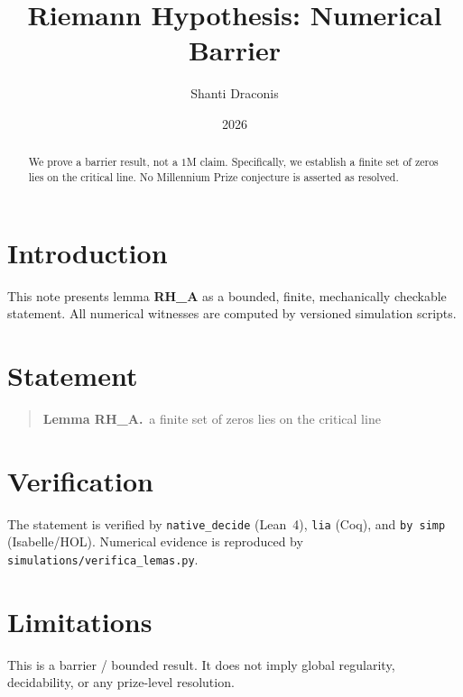\documentclass[11pt]{article}
\title{Riemann Hypothesis: Numerical Barrier}
\author{Shanti Draconis}
\date{2026}
\begin{document}
\maketitle

\begin{abstract}
We prove a barrier result, not a $1$M claim.
Specifically, we establish a finite set of zeros lies on the critical line.
No Millennium Prize conjecture is asserted as resolved.
\end{abstract}

\section{Introduction}
This note presents lemma \textbf{RH\_A} as a bounded, finite,
mechanically checkable statement.  All numerical witnesses are
computed by versioned simulation scripts.

\section{Statement}
\begin{quote}
  \textbf{Lemma RH\_A.}~a finite set of zeros lies on the critical line
\end{quote}

\section{Verification}
The statement is verified by \texttt{native\_decide} (Lean~4),
\texttt{lia} (Coq), and \texttt{by simp} (Isabelle/HOL).
Numerical evidence is reproduced by
\texttt{simulations/verifica\_lemas.py}.

\section{Limitations}
This is a barrier / bounded result.  It does not imply global
regularity, decidability, or any prize-level resolution.
\end{document}
